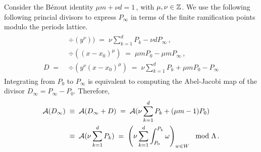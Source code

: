 \documentclass[main.tex]{subfiles}
\begin{document}
    Consider the Bézout identity $\mu m + \nu d = 1$\,, with $\mu,\nu \in \mathbb{Z}$. We use the following following princial divisors to express $P_{\infty}$ in terms of the finite ramification points
    modulo the periods lattice.
    \begin{align}
     \begin{split}
      &\div(y^{\nu}) )\; = \; \nu \sum_{k = 1}^d P_k - \nu d P_{\infty}\,,\\
      &\div((x-x_0)^{\mu}) \; = \; \mu m P_0 - \mu m P_{\infty} \,,\\
      D \; = \; & \div(y^{\nu}(x-x_0)^{\mu}) \; = \;\nu \sum_{k = 1}^d P_k + \mu m P_0 - P_{\infty}  
     \end{split}
    \end{align}
    Integrating from $P_0$ to $P_{\infty}$ is equivalent to computing the Abel-Jacobi map of the divisor $D_{\infty} =  P_{\infty} - P_0 $. Therefore,
    \begin{align}
     \mathcal{A}( D_{\infty} ) \; & \equiv \; \mathcal{A}(D_{\infty} + D) \; = \; \mathcal{A}(  \nu \sum_{k = 1}^d P_k + (\mu m - 1) P_0  ) \\ \; & \equiv \; \mathcal{A}(  \nu \sum_{k = 1}^d P_k  ) 
     \; =  \; \left( \nu \sum_{k=1}^d \int_{P_0}^{P_k} \omega \right)_{w \in W} \mod \Lambda\,.
    \end{align}

      
\biblio
\end{document}
